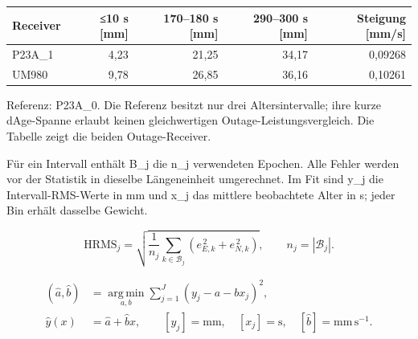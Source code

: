 \documentclass[11pt,a4paper]{article}
\numberwithin{equation}{section}
\numberwithin{figure}{section}
\begin{document}
\begin{center}\begin{lrbox}{\reporttable}\small\setlength{\tabcolsep}{4pt}\begin{tabular}{lrrrr}\toprule
Receiver & ≤10 s [mm] & 170–180 s [mm] & 290–300 s [mm] & Steigung [mm/\allowbreak{}s]\\\midrule
P23A\_1 & 4,23 & 21,25 & 34,17 & 0,09268\\
UM980 & 9,78 & 26,85 & 36,16 & 0,10261\\
\bottomrule\end{tabular}\end{lrbox}\ifdim\wd\reporttable>\linewidth\resizebox{\linewidth}{!}{\usebox{\reporttable}}\else\usebox{\reporttable}\fi\end{center}

Referenz: P23A\_0. Die Referenz besitzt nur drei Altersintervalle; ihre kurze dAge-Spanne erlaubt keinen gleichwertigen Outage-Leistungsvergleich. Die Tabelle zeigt die beiden Outage-Receiver.

Für ein Intervall enthält B\_j die n\_j verwendeten Epochen. Alle Fehler werden vor der Statistik in dieselbe Längeneinheit umgerechnet. Im Fit sind y\_j die Intervall-RMS-Werte in mm und x\_j das mittlere beobachtete Alter in s; jeder Bin erhält dasselbe Gewicht.

\begin{equation}\mathrm{HRMS}_j=\sqrt{\frac{1}{n_j}\sum_{k\in\mathcal B_j}\left(e_{E,k}^{\,2}+e_{N,k}^{\,2}\right)},\qquad n_j=|\mathcal B_j|.\label{eq:de-hrms}\end{equation}

\begin{equation}\begin{aligned}(\hat a,\hat b)&=\underset{a,b}{\operatorname{arg\,min}}\sum_{j=1}^{J}(y_j-a-bx_j)^2,\\ \hat y(x)&=\hat a+\hat b x,\qquad [y_j]=\mathrm{mm},\quad [x_j]=\mathrm{s},\quad [\hat b]=\mathrm{mm\,s^{-1}}.\end{aligned}\label{eq:de-fit}\end{equation}
\end{document}
